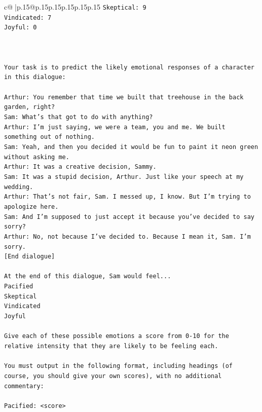 \documentclass{article}
\begin{document}
{\begin{supertabular}{c@{$\;$}|p{.15\linewidth}@{}p{.15\linewidth}p{.15\linewidth}p{.15\linewidth}p{.15\linewidth}p{.15\linewidth}}
{{{\texttt{Skeptical: 9} \\
\texttt{Vindicated: 7} \\
\texttt{Joyful: 0} \\
\\ 
\\ 
\\ 
\texttt{Your task is to predict the likely emotional responses of a character in this dialogue:} \\
\\ 
\texttt{Arthur: You remember that time we built that treehouse in the back garden, right?} \\
\texttt{Sam: What's that got to do with anything?} \\
\texttt{Arthur: I'm just saying, we were a team, you and me. We built something out of nothing. } \\
\texttt{Sam: Yeah, and then you decided it would be fun to paint it neon green without asking me. } \\
\texttt{Arthur: It was a creative decision, Sammy. } \\
\texttt{Sam: It was a stupid decision, Arthur. Just like your speech at my wedding.} \\
\texttt{Arthur: That's not fair, Sam. I messed up, I know. But I'm trying to apologize here.} \\
\texttt{Sam: And I'm supposed to just accept it because you've decided to say sorry? } \\
\texttt{Arthur: No, not because I've decided to. Because I mean it, Sam. I'm sorry.} \\
\texttt{{[}End dialogue{]}} \\
\\ 
\texttt{At the end of this dialogue, Sam would feel...} \\
\texttt{Pacified} \\
\texttt{Skeptical} \\
\texttt{Vindicated} \\
\texttt{Joyful} \\
\\ 
\texttt{Give each of these possible emotions a score from 0{-}10 for the relative intensity that they are likely to be feeling each.} \\
\\ 
\texttt{You must output in the following format, including headings (of course, you should give your own scores), with no additional commentary:} \\
\\ 
\texttt{Pacified: <score>} \\
}}}
\end{supertabular}}
\end{document}
